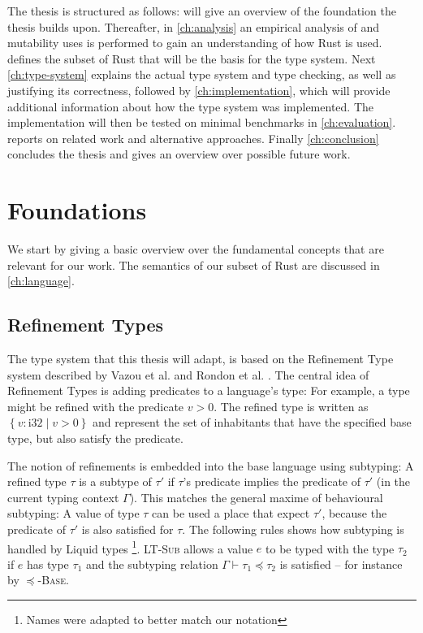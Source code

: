 \documentclass[twoside, english, final]{sdqthesis}
\theoremstyle{definition}
\begin{document}
The thesis is structured as follows: 
 will give an overview of the foundation the thesis builds upon.
Thereafter, in \cref{ch:analysis} an empirical analysis of  and mutability uses is performed to gain an understanding of how Rust is used.
 defines the subset of Rust that will be the basis for the type system.
Next \cref{ch:type-system} explains the actual type system and type checking, as well as justifying its correctness, followed by \cref{ch:implementation}, which will provide additional information about how the type system was implemented.
The implementation will then be tested on minimal benchmarks in \cref{ch:evaluation}.
 reports on related work and alternative approaches.
Finally \cref{ch:conclusion} concludes the thesis and gives an overview over possible future work.

\chapter{Foundations} \label{ch:foundations}

We start by giving a basic overview over the fundamental concepts that are relevant for our work.
The semantics of our subset of Rust are discussed in \cref{ch:language}.

\section{Refinement Types}

The type system that this thesis will adapt, is based on the Refinement Type system described by Vazou et al. \cite{vazou_abstract_2013} and Rondon et al. \cite{rondon_liquid_2008}. 
The central idea of Refinement Types is adding predicates to a language's type: For example, a type  might be refined with the predicate $v > 0$. The refined type is written as $\left\{ v : \text{i32} \mid v > 0 \right\}$ and represent the set of inhabitants that have the specified base type, but also satisfy the predicate. 

The notion of refinements is embedded into the base language using subtyping: A refined type $\tau$ is a subtype of $\tau'$ if $\tau$'s predicate implies the predicate of $\tau'$ (in the current typing context $\Gamma$). This matches the general maxime of behavioural subtyping: A value of type $\tau$ can be used a place that expect $\tau'$, because the predicate of $\tau'$ is also satisfied for $\tau$.
The following rules shows how subtyping is handled by Liquid types \cite[p. 6]{rondon_liquid_2008}\footnote{Names were adapted to better match our notation}. \textsc{LT-Sub} allows a value $e$ to be typed with the type $\tau_2$ if $e$ has type $\tau_1$ and the subtyping relation $\Gamma \vdash \tau_1 \preceq \tau_2$ is satisfied -- for instance by \textsc{$\preceq$-Base}. 
\end{document}
